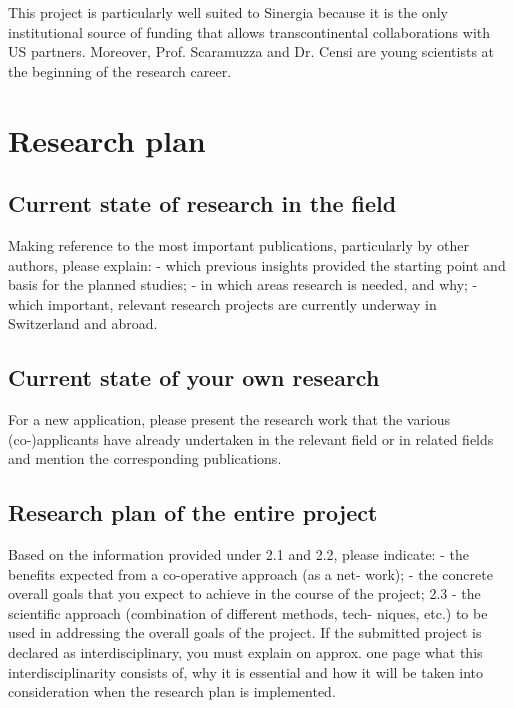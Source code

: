 This project is particularly well suited to Sinergia because it is the only
institutional source of funding that allows transcontinental collaborations
with US partners. Moreover, Prof. Scaramuzza and Dr. Censi are young scientists
at the beginning of the research career.


\section{Research plan}




\subsection{Current state of research in the field}

Making reference to the most important publications, particularly by other authors,
please explain: - which previous insights provided the starting point and basis
for the planned studies; - in which areas research is needed, and why; - which
important, relevant research projects are currently underway in Switzerland
and abroad.


\subsection{Current state of your own research}

For a new application, please present the research work that the various (co-)applicants
have already undertaken in the relevant field or in related fields and mention
the corresponding publications.


\subsection{Research plan of the entire project}

Based on the information provided under 2.1 and 2.2, please indicate: - the
benefits expected from a co-operative approach (as a net- work); - the concrete
overall goals that you expect to achieve in the course of the project; 2.3 -
the scientific approach (combination of different methods, tech- niques, etc.)
to be used in addressing the overall goals of the project. If the submitted
project is declared as interdisciplinary, you must explain on approx. one page
what this interdisciplinarity consists of, why it is essential and how it will
be taken into consideration when the research plan is implemented.


